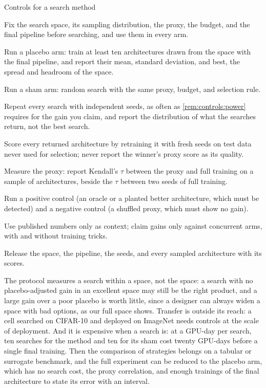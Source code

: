 \begin{refsection}
\begin{protocol}{Controls for a search method}\label{prot:controls:search}
\item Fix the search space, its sampling distribution, the proxy, the budget, and the final pipeline before searching, and use them in every arm.
\item Run a placebo arm: train at least ten architectures drawn from the space with the final pipeline, and report their mean, standard deviation, and best, the spread and headroom of the space.
\item Run a sham arm: random search with the same proxy, budget, and selection rule.
\item Repeat every search with independent seeds, as often as \cref{rem:controls:power} requires for the gain you claim, and report the distribution of what the searches return, not the best search.
\item Score every returned architecture by retraining it with fresh seeds on test data never used for selection; never report the winner's proxy score as its quality.
\item Measure the proxy: report Kendall's $\tau$ between the proxy and full training on a sample of architectures, beside the $\tau$ between two seeds of full training.
\item Run a positive control (an oracle or a planted better architecture, which must be detected) and a negative control (a shuffled proxy, which must show no gain).
\item Use published numbers only as context; claim gains only against concurrent arms, with and without training tricks.
\item Release the space, the pipeline, the seeds, and every sampled architecture with its scores.
\end{protocol}

The protocol measures a search within a space, not the space: a search with no placebo-adjusted gain in an excellent space may still be the right product, and a large gain over a poor placebo is worth little, since a designer can always widen a space with bad options, as our full space shows. Transfer is outside its reach: a cell searched on CIFAR-10 and deployed on ImageNet needs controls at the scale of deployment. And it is expensive when a search is: at a GPU-day per search, ten searches for the method and ten for its sham cost twenty GPU-days before a single final training. Then the comparison of strategies belongs on a tabular or surrogate benchmark, and the full experiment can be reduced to the placebo arm, which has no search cost, the proxy correlation, and enough trainings of the final architecture to state its error with an interval.


\end{refsection}
